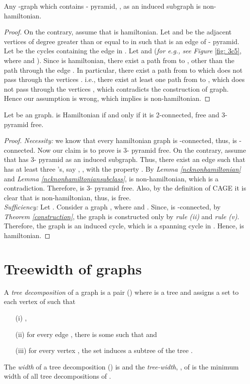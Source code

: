 \documentclass[runningheads]{llncs}
\begin{document}
\begin{lemma}
\label{ncknonhamiltoniansubclass}
Any -graph  which contains - pyramid, , as an induced subgraph is non-hamiltonian.
\end{lemma}
\begin{proof}
On the contrary, assume that  is hamiltonian. Let  and  be the adjacent vertices of degree greater than or equal to  in  such that  is an edge of - pyramid. Let  be the  cycles containing the edge  in . Let  and  (\emph{for e.g.,} \emph{see} \emph{Figure } \ref{fig: 3c5}, where  and ). Since  is hamiltonian, there exist a path from  to ,  other than the path through the edge . In particular, there exist a path from  to  which does not pass through the vertices . i.e., there exist at least one path  from  to ,  which does not pass through the vertices , which contradicts the construction of  graph. Hence our assumption is wrong, which implies  is non-hamiltonian.  
\end{proof}

\begin{theorem}
 Let  be an  graph.  is Hamiltonian if and only if it is 2-connected,  free and 3- pyramid free.
\end{theorem}
\begin{proof}
\emph{Necessity:} we know that every hamiltonian graph is -connected, thus,  is -connected. Now our claim is to prove  is 3- pyramid free. On the contrary, assume that  has 3- pyramid as an induced subgraph. Thus, there exist an edge  such that  has at least three 's, say , , with the property . By \emph{Lemma \ref{ncknonhamiltonian}} and \emph{Lemma \ref{ncknonhamiltoniansubclass}},  is non-hamiltonian, which is a contradiction. Therefore,  is 3- pyramid free. Also, by the definition of CAGE it is clear that  is non-hamiltonian, thus,  is  free.
\\
\emph{Sufficiency:} Let . Consider a graph , where  and . Since,  is -connected, by \emph{Theorem \ref{construction}}, the graph  is constructed only by \emph{rule (ii)} and \emph{rule (v)}. Therefore, the graph  is an induced cycle, which is a spanning cycle in . Hence,  is hamiltonian. 
\end{proof}

\section{Treewidth of  graphs}
 A \emph{tree decomposition}\cite{kloks} of a graph  is a pair () where  is a tree and  assigns a set  to each vertex  of  such that 
\begin{itemize}
\item[(i)] ,
\item[(ii)] for every edge , there is some  such that  and
\item[(iii)] for every vertex , the set  induces a subtree of the tree .
\end{itemize}
The \emph{width} of a tree decomposition () is  and the \emph{tree-width}, , of  is the minimum width of all tree decompositions of .  
\end{document}

